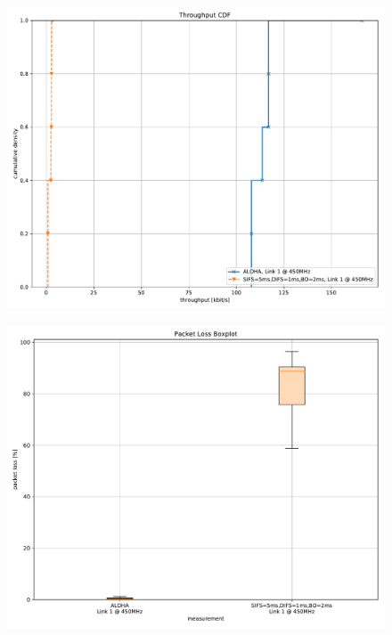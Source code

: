 \documentclass{article}
\begin{document}
\begin{figure}
	\includegraphics[width=\textwidth]{aloha_rb_low/cdf/throughput_cdf}
\end{figure}

\begin{figure}
	\includegraphics[width=\textwidth]{aloha_rb_low/boxplot/packet_loss_boxplot}
\end{figure}
\end{document}
